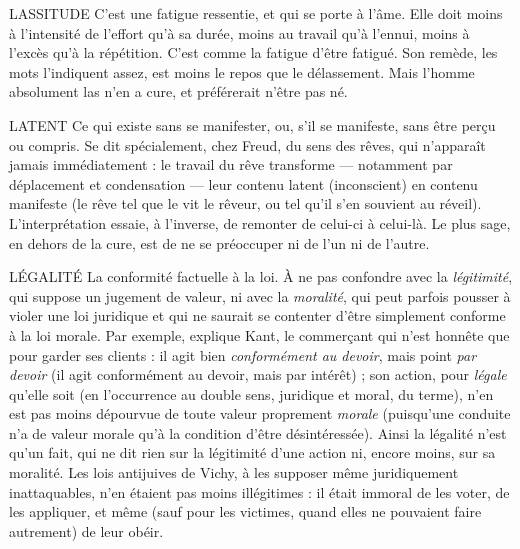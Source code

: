 {LASSITUDE C’est une fatigue ressentie, et qui se porte à l’âme. Elle doit
moins à l’intensité de l’effort qu’à sa durée, moins au travail
qu’à l'ennui, moins à l'excès qu’à la répétition. C’est comme la fatigue d’être
fatigué. Son remède, les mots l’indiquent assez, est moins le repos que le délassement.
Mais l’homme absolument las n’en a cure, et préférerait n'être pas né.

LATENT Ce qui existe sans se manifester, ou, s’il se manifeste, sans être
perçu ou compris. Se dit spécialement, chez Freud, du sens des
rêves, qui n'apparaît jamais immédiatement : le travail du rêve transforme —
notamment par déplacement et condensation — leur contenu latent (inconscient)
en contenu manifeste (le rêve tel que le vit le rêveur, ou tel qu’il s’en souvient au
réveil). L'interprétation essaie, à l'inverse, de remonter de celui-ci à celui-là. Le
plus sage, en dehors de la cure, est de ne se préoccuper ni de l’un ni de l’autre.

LÉGALITÉ La conformité factuelle à la loi. À ne pas confondre avec la {\it légitimité},
qui suppose un jugement de valeur, ni avec la {\it moralité},
qui peut parfois pousser à violer une loi juridique et qui ne saurait se
contenter d’être simplement conforme à la loi morale. Par exemple, explique
Kant, le commerçant qui n’est honnête que pour garder ses clients : il agit
bien {\it conformément au devoir}, mais point {\it par devoir} (il agit conformément au
devoir, mais par intérêt) ; son action, pour {\it légale} qu’elle soit (en l’occurrence
au double sens, juridique et moral, du terme), n’en est pas moins dépourvue
de toute valeur proprement {\it morale} (puisqu’une conduite n’a de valeur morale
qu’à la condition d’être désintéressée). Ainsi la légalité n’est qu’un fait, qui ne
dit rien sur la légitimité d’une action ni, encore moins, sur sa moralité. Les
lois antijuives de Vichy, à les supposer même juridiquement inattaquables,
n’en étaient pas moins illégitimes : il était immoral de les voter, de les appliquer,
et même (sauf pour les victimes, quand elles ne pouvaient faire autrement)
de leur obéir.

}
